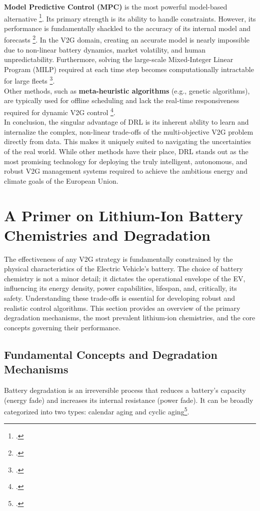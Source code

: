 \noindent
\textbf{Model Predictive Control (MPC)} is the most powerful model-based alternative \footcite{alsabbagh2022reinforcement}. Its primary strength is its ability to handle constraints. However, its performance is fundamentally shackled to the accuracy of its internal model and forecasts \footcite{faggio2023design}. In the V2G domain, creating an accurate model is nearly impossible due to non-linear battery dynamics, market volatility, and human unpredictability. Furthermore, solving the large-scale Mixed-Integer Linear Program (MILP) required at each time step becomes computationally intractable for large fleets \footcite{schwenk2022computationally}.
\\
\noindent
Other methods, such as \textbf{meta-heuristic algorithms} (e.g., genetic algorithms), are typically used for offline scheduling and lack the real-time responsiveness required for dynamic V2G control \footcite{ghosh2024optimal, kumar2024integration}.
\\
\noindent
In conclusion, the singular advantage of DRL is its inherent ability to learn and internalize the complex, non-linear trade-offs of the multi-objective V2G problem directly from data. This makes it uniquely suited to navigating the uncertainties of the real world. While other methods have their place, DRL stands out as the most promising technology for deploying the truly intelligent, autonomous, and robust V2G management systems required to achieve the ambitious energy and climate goals of the European Union.

\section{A Primer on Lithium-Ion Battery Chemistries and Degradation}
The effectiveness of any V2G strategy is fundamentally constrained by the physical characteristics of the Electric Vehicle's battery. The choice of battery chemistry is not a minor detail; it dictates the operational envelope of the EV, influencing its energy density, power capabilities, lifespan, and, critically, its safety. Understanding these trade-offs is essential for developing robust and realistic control algorithms. This section provides an overview of the primary degradation mechanisms, the most prevalent lithium-ion chemistries, and the core concepts governing their performance.

\subsection{Fundamental Concepts and Degradation Mechanisms}
Battery degradation is an irreversible process that reduces a battery's capacity (energy fade) and increases its internal resistance (power fade). It can be broadly categorized into two types: calendar aging and cyclic aging\footcite{birkl2017degradation}.

